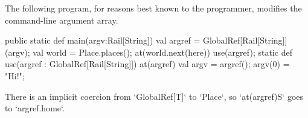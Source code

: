 \begin{ex}The following program, for reasons best known to the programmer,
modifies the 
command-line argument array.


% 
\begin{xten}
  public static def main(argv:Rail[String]) {
    val argref = GlobalRef[Rail[String]](argv);
    val world = Place.places();
    at(world.next(here)) 
        use(argref);
  }
  static def use(argref : GlobalRef[Rail[String]]) {
    at(argref) {
      val argv = argref();
      argv(0) = "Hi!";
    }
  }
\end{xten}

\end{ex}

There is an implicit coercion from \xcd`GlobalRef[T]` to \xcd`Place`, so
\xcd`at(argref)S` goes to \xcd`argref.home`.  


